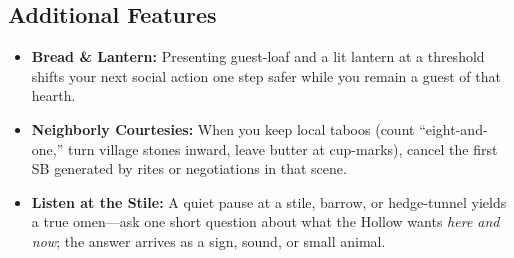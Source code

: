 \subsection*{Additional Features}
\begin{itemize}
\item \textbf{Bread \& Lantern:} Presenting guest-loaf and a lit lantern at a threshold shifts your next social action one step safer while you remain a guest of that hearth.
\item \textbf{Neighborly Courtesies:} When you keep local taboos (count ``eight-and-one,'' turn village stones inward, leave butter at cup-marks), cancel the first SB generated by rites or negotiations in that scene.
\item \textbf{Listen at the Stile:} A quiet pause at a stile, barrow, or hedge-tunnel yields a true omen---ask one short question about what the Hollow wants \emph{here and now}; the answer arrives as a sign, sound, or small animal.
\end{itemize}

